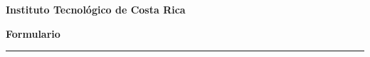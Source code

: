 \documentclass{article}
\begin{document}
\textbf{Instituto Tecnológico de Costa Rica}
\begin{center}
    \Huge
    \textbf{Formulario}
\end{center}
\vspace{0.2in}
\hrule
\vspace{0.2in}




\end{document}
